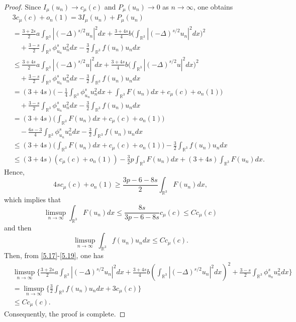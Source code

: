 \documentclass[11pt]{article}
\numberwithin{equation}{section}
\begin{document}
\begin{proof} 
Since $I_\mu(u_n)\to c_\mu(c)$ and $P_\mu(u_n)\to 0$ as $n \to \infty$, one obtains
\begin{equation}\label{5.17}
\begin{split}
&3c_\mu(c)+o_n {(1)}=3I_\mu(u_n)+P_\mu(u_n)\\
&= \frac{3+2s}{2}a\int_{\mathbb{R}^3}|(-\Delta)^{s/2}u_n|^2dx
+\frac{3+4s}{4}b\Big(\int_{\mathbb{R}^3}|(-\Delta)^{s/2}u_n|^2dx\Big)^2\\
&\quad +\frac{3-s}{2}\int_{\mathbb{R}^3}\phi^s_{u_n} u^2_ndx
 -\frac{3}{2}\int_{\mathbb{R}^3}f(u_n)u_ndx\\
&\leq  \frac{3+4s}{2}a\int_{\mathbb{R}^3}|(-\Delta)^{s/2}u|^2dx
+\frac{3+4s}{4}b\Big(\int_{\mathbb{R}^3}|(-\Delta)^{s/2}u|^2dx\Big)^2\\
&\quad +\frac{3-s}{2}\int_{\mathbb{R}^3}\phi^s_{u_n} u^2_ndx-\frac{3}{2}\int_{\mathbb{R}^3}f(u_n)u_ndx\\
&= (3+4s)\Big(-\frac{1}{4}\int_{\mathbb{R}^3}\phi^s_{u_n} u^2_ndx
 +\int_{\mathbb{R}^3}F(u_n)dx+c_\mu(c)+o_n(1)\Big)\\
&\quad +\frac{3-s}{2}\int_{\mathbb{R}^3}\phi^s_{u_n} u^2_ndx
 -\frac{3}{2}\int_{\mathbb{R}^3}f(u_n)u_ndx\\
&= (3+4s)\Big(\int_{\mathbb{R}^3}F(u_n)dx+c_\mu(c)+o_n(1)\Big)\\
&\quad -\frac{6s-3}{4}\int_{\mathbb{R}^3}\phi^s_{u_n} u^2_ndx-\frac{3}{2}\int_{\mathbb{R}^3}f(u_n)u_ndx\\
&\leq  (3+4s)\Big(\int_{\mathbb{R}^3}F(u_n)dx+c_\mu(c)+o_n(1)\Big)
 -\frac{3}{2}\int_{\mathbb{R}^3}f(u_n)u_ndx\\
&\leq  (3+4s)(c_\mu(c)+o_n(1))-\frac{3}{2}p\int_{\mathbb{R}^3}F(u_n)dx
 +(3+4s)\int_{\mathbb{R}^3}F(u_n)dx.
\end{split}
\end{equation}
Hence,
$$
4sc_\mu(c)+o_n(1)\geq \frac{3p-6-8s}{2}\int_{\mathbb{R}^3}F(u_n)dx,
$$
which implies that
\begin{equation}\label{5.18}
\limsup_{n\to \infty} \int_{\mathbb{R}^3}F(u_n)dx
\leq \frac{8s}{3p-6-8s}c_\mu(c) 
\leq C c_\mu(c)
\end{equation}
and then
\begin{equation}\label{5.19}
\limsup_{n\to \infty} \int_{\mathbb{R}^3}f(u_n)u_ndx \leq C c_\mu(c).
\end{equation}
Then, from \eqref{5.17}-\eqref{5.19}, one has
\begin{align*} %
&\limsup_{n\to \infty}\Big\{\frac{3+2s}{2}a
 \int_{\mathbb{R}^3}|(-\Delta)^{s/2}u_n|^2dx
 +\frac{3+4s}{4}b(\int_{\mathbb{R}^3}|(-\Delta)^{s/2}u_n|^2dx)^2
 +\frac{3-s}{2}\int_{\mathbb{R}^3}\phi^s_{u_n} u^2_ndx\Big\}\\
&= \limsup_{n\to \infty}\Big\{\frac{3}{2}\int_{\mathbb{R}^3}f(u_n)u_ndx+3c_\mu(c)\Big\}\\
&\leq  C c_\mu(c).
\end{align*}
Consequently, the proof is complete.
\end{proof}
\end{document}

